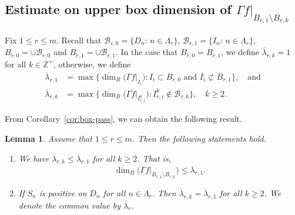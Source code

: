 \documentclass[11pt]{amsart}
\newtheorem{lem}[thm]{Lemma}
\theoremstyle{definition}
\theoremstyle{remark}
\numberwithin{equation}{section}
\newcommand{\Z}{{\mathbb Z}}
\newcommand{\mB}{{\mathcal B}}
\newcommand{\uplam}{{\overline{\lambda}}}
\def\updimB{\overline{\dim}_B}
\begin{document}
\subsection{Estimate on upper box dimension of $\Gamma f|_{ B_{r,1} \setminus B_{r,k}}$}

Fix $1 \leq r \leq m$. Recall that $\mB_{r,0}=\{D_n:\, n\in \Lambda_{r}\}$, $\mB_{r,1}=\{I_n:\, n\in \Lambda_r\}$, $B_{r,0}=\cup \mB_{r,0}$ and $B_{r,1}=\cup \mB_{r,1}$. In the case that $ B_{r,0}=B_{r,1}$, we define $\uplam_{r,k}=1$ for all $k \in \Z^+$, otherwise, we define
\begin{align*}
	\uplam_{r,1} &=\max\big\{  \updimB \big(\Gamma f|_{I_i}\big): I_i \subset B_{r,0} \textrm{ and } I_i \not\subset B_{r,1} \big\}, \quad \mbox{and} \\
	\uplam_{r,k} &=\max\big\{ \updimB\big(\Gamma f|_{I_{r,i}^k}\big): I_{r,i}^k\not\in \mB_{r,k}   \big\}, \quad k\geq 2.
\end{align*}

From Corollary~\ref{cor:box-pass}, we can obtain the following result.


\begin{lem}\label{lem:box-up-eks}
	Assume that $1 \leq r \leq m$. Then the following statements hold.
	\begin{enumerate}
		\item We have $\uplam_{r,k} \leq \uplam_{r,1}$ for all $k \geq 2$. That is,
		$$
		\updimB \big(\Gamma f|_{ B_{r,1} \setminus B_{r,k} }\big)\leq \uplam_{r,1}.
		$$
		\item If $S_n$ is positive on $D_n$ for all $n\in \Lambda_r$. Then $\uplam_{r,k}=\uplam_{r,1}$ for all $k \geq 2$. We denote the common value by $\uplam_r$.
	\end{enumerate}
\end{lem}
\end{document}
